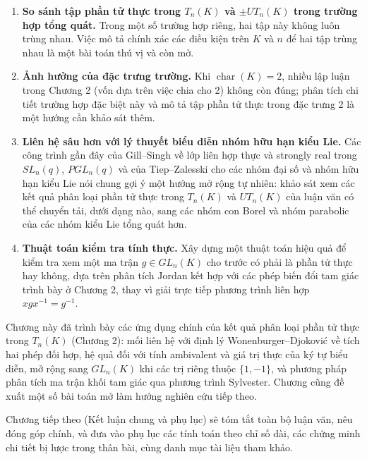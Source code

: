 \begin{enumerate}
  \item \textbf{So sánh tập phần tử thực trong $T_n(K)$ và $\pm UT_n(K)$ trong trường hợp tổng quát.} Trong một số trường hợp riêng, hai tập này không luôn trùng nhau. Việc mô tả chính xác các điều kiện trên $K$ và $n$ để hai tập trùng nhau là một bài toán thú vị và còn mở.

  \item \textbf{Ảnh hưởng của đặc trưng trường.} Khi $\operatorname{char}(K) = 2$, nhiều lập luận trong Chương 2 (vốn dựa trên việc chia cho 2) không còn đúng; phân tích chi tiết trường hợp đặc biệt này và mô tả tập phần tử thực trong đặc trưng 2 là một hướng cần khảo sát thêm.

  \item \textbf{Liên hệ sâu hơn với lý thuyết biểu diễn nhóm hữu hạn kiểu Lie.} Các công trình gần đây của Gill--Singh về lớp liên hợp thực và strongly real trong $SL_n(q)$, $PGL_n(q)$ \cite{GillSingh2009,GillSingh2011a,GillSingh2011b} và của Tiep--Zalesski cho các nhóm đại số và nhóm hữu hạn kiểu Lie nói chung \cite{TiepZalesski2005} gợi ý một hướng mở rộng tự nhiên: khảo sát xem các kết quả phân loại phần tử thực trong $T_n(K)$ và $UT_n(K)$ của luận văn có thể chuyển tải, dưới dạng nào, sang các nhóm con Borel và nhóm parabolic của các nhóm kiểu Lie tổng quát hơn.

  \item \textbf{Thuật toán kiểm tra tính thực.} Xây dựng một thuật toán hiệu quả để kiểm tra xem một ma trận $g \in GL_n(K)$ cho trước có phải là phần tử thực hay không, dựa trên phân tích Jordan kết hợp với các phép biến đổi tam giác trình bày ở Chương 2, thay vì giải trực tiếp phương trình liên hợp $xgx^{-1} = g^{-1}$.
\end{enumerate}

Chương này đã trình bày các ứng dụng chính của kết quả phân loại phần tử thực trong $T_n(K)$ (Chương 2): mối liên hệ với định lý Wonenburger--Djoković về tích hai phép đối hợp, hệ quả đối với tính ambivalent và giá trị thực của ký tự biểu diễn, mở rộng sang $GL_n(K)$ khi các trị riêng thuộc $\{1,-1\}$, và phương pháp phân tích ma trận khối tam giác qua phương trình Sylvester. Chương cũng đề xuất một số bài toán mở làm hướng nghiên cứu tiếp theo.

Chương tiếp theo (Kết luận chung và phụ lục) sẽ tóm tắt toàn bộ luận văn, nêu đóng góp chính, và đưa vào phụ lục các tính toán theo chỉ số dài, các chứng minh chi tiết bị lược trong thân bài, cùng danh mục tài liệu tham khảo.
